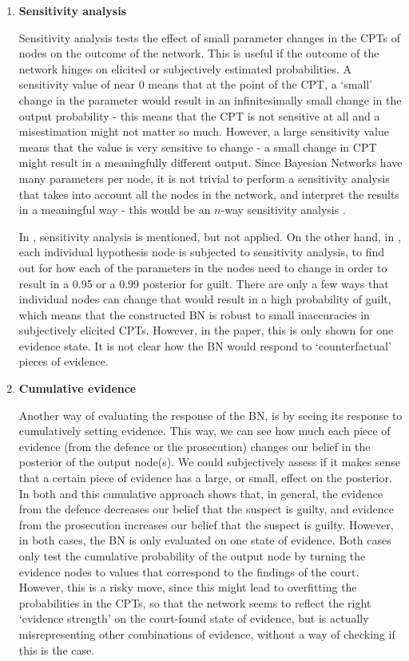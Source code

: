 \documentclass[11pt]{article}
\begin{document}
\begin{enumerate}

\item \textbf{Sensitivity analysis}

Sensitivity analysis tests the effect of small parameter changes in the CPTs of nodes on the outcome of the network. This is useful if the outcome of the network hinges on elicited or subjectively estimated probabilities. A sensitivity value of near 0 means that at the point of the CPT, a `small' change in the parameter would result in an infinitesimally small change in the output probability - this means that the CPT is not sensitive at all and a misestimation might not matter so much. However, a large sensitivity value means that the value is very sensitive to change - a small change in CPT might result in a meaningfully different output.  Since Bayesian Networks have many parameters per node, it is not trivial to perform a sensitivity analysis that takes into account all the nodes in the network, and interpret the results in a meaningful way - this would be an $n$-way sensitivity analysis \citep{gaag2007}.  

In \citet{vlek2016}, sensitivity analysis is mentioned, but not applied. On the other hand, in \citet{Fenton2019}, each individual hypothesis node is subjected to sensitivity analysis, to find out for how each of the parameters in the nodes need to change in order to result in a 0.95 or a 0.99 posterior for guilt. There are only a few ways that individual nodes can change that would result in a high probability of guilt, which means that the constructed BN is robust to small inaccuracies in subjectively elicited CPTs. However, in the paper, this is only shown for one evidence state. It is not clear how the BN would respond to `counterfactual' pieces of evidence.


\item \textbf{Cumulative evidence}

Another way of evaluating the response of the BN, is by seeing its response to cumulatively setting evidence. This way, we can see how much each piece of evidence (from the defence or the prosecution) changes our belief in the posterior of the output node(s). We could subjectively assess if it makes sense that a certain piece of evidence has a large, or small, effect on the posterior. In both \citep{Fenton2019} and \citep{vlek2016} this cumulative approach shows that, in general, the evidence from the defence decreases our belief that the suspect is guilty, and evidence from the prosecution increases our belief that the suspect is guilty. However, in both cases, the BN is only evaluated on one state of evidence. Both cases only test the cumulative probability of the output node by turning the evidence nodes to values that correspond to the findings of the court. However, this is a risky move, since this might lead to overfitting the probabilities in the CPTs, so that the network seems to reflect the right `evidence strength' on the court-found state of evidence, but is actually misrepresenting other combinations of evidence, without a way of checking if this is the case.




\end{enumerate}
\end{document}
